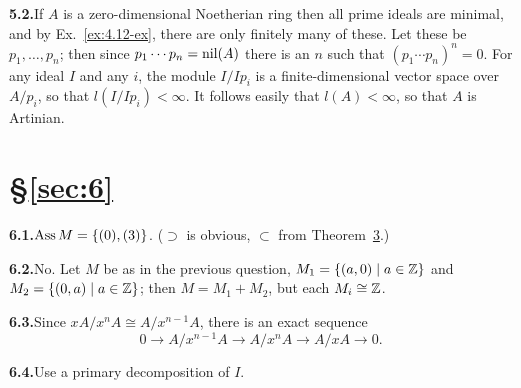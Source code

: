 \noindent\textbf{5.2.}\quad If $A$ is a zero-dimensional Noetherian ring then all prime ideals are
minimal, and by Ex.~\ref{ex:4.12-ex}, there are only finitely many of these. Let these be
$p_1, \ldots, p_n$; then since $p_1 \cdots p_n = \operatorname{nil}(A)$ there is an $n$ such that $(p_1 \cdots p_n)^n = 0$.
For any ideal $I$ and any $i$, the module $I/Ip_i$ is a finite-dimensional vector
space over $A/p_i$, so that $l(I/Ip_i) < \infty$. It follows easily that $l(A) < \infty$, so that
$A$ is Artinian.

\section*{\S\ref{sec:6}}

\noindent\textbf{6.1.}\quad $\operatorname{Ass} M = \{(0), (3)\}$. ($\supset$ is obvious, $\subset$ from Theorem~\hyperref[thm:6.3]{3}.)

\noindent\textbf{6.2.}\quad No. Let $M$ be as in the previous question, $M_1 = \{(a, 0) \mid a \in \mathbb{Z}\}$ and
$M_2 = \{(0, a) \mid a \in \mathbb{Z}\}$; then $M = M_1 + M_2$, but each $M_i \cong \mathbb{Z}$.

\noindent\textbf{6.3.}\quad Since $xA/x^nA \cong A/x^{n-1}A$, there is an exact sequence
\[
  0 \to A/x^{n-1}A \to A/x^nA \to A/xA \to 0.
\]

\noindent\textbf{6.4.}\quad Use a primary decomposition of $I$.
